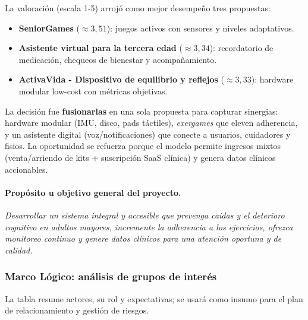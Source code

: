 La valoración (escala 1-5) arrojó como mejor desempeño tres propuestas: 
\begin{itemize}
    \item \textbf{SeniorGames} (\(\approx 3{,}51\)): juegos activos con sensores y niveles adaptativos.
    \item \textbf{Asistente virtual para la tercera edad} (\(\approx 3{,}34\)): recordatorio de medicación, chequeos de bienestar y acompañamiento.
    \item \textbf{ActivaVida - Dispositivo de equilibrio y reflejos} (\(\approx 3{,}33\)): hardware modular low-cost con métricas objetivas.
\end{itemize}

La decisión fue \textbf{fusionarlas} en una sola propuesta para capturar sinergias: hardware modular (IMU, disco, pads táctiles), \emph{exergames} que eleven adherencia, y un asistente digital (voz/notificaciones) que conecte a usuarios, cuidadores y fisios. La oportunidad se refuerza porque el modelo permite ingresos mixtos (venta/arriendo de kits + suscripción SaaS clínica) y genera datos clínicos accionables.

\paragraph{Propósito u objetivo general del proyecto.} \emph{Desarrollar un sistema integral y accesible que prevenga caídas y el deterioro cognitivo en adultos mayores, incremente la adherencia a los ejercicios, ofrezca monitoreo continuo y genere datos clínicos para una atención oportuna y de calidad.}

\subsubsection{Marco Lógico: análisis de grupos de interés}
La tabla resume actores, su rol y expectativas; se usará como insumo para el plan de relacionamiento y gestión de riesgos.

